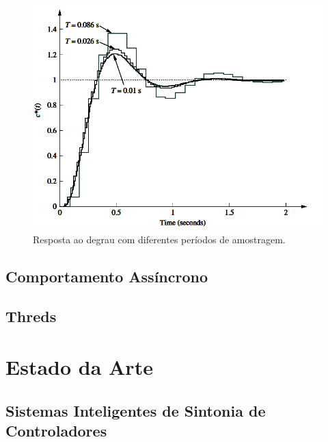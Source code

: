\begin{figure}[htb]
  \caption{Resposta ao degrau com diferentes períodos de amostragem.}
  \begin{center}
      \includegraphics[scale=0.65]{img/nise_digitalinput_p761}
  \end{center}
  \label{fig:nise_digitalinput_p761}
\end{figure}

\subsection{Comportamento Assíncrono}

\subsection{Threds}

\section{Estado da Arte}

\subsection{Sistemas Inteligentes de Sintonia de Controladores}

